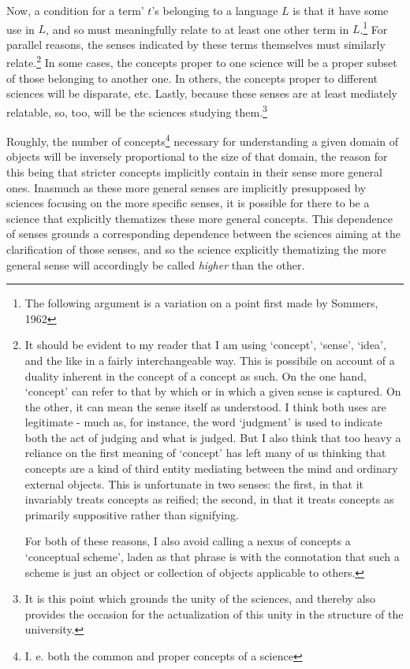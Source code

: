 \documentclass[]{article}
\begin{document}
Now, a condition for a term' $t$'s belonging to a language $L$ is that it have some use in $L$, and so must meaningfully relate to at least one other term in $L$.\footnote{The following argument is a variation on a point first made by Sommers, 1962} For parallel reasons, the senses indicated by these terms themselves must similarly relate.\footnote{It should be evident to my reader that I am using `concept', `sense', `idea', and the like in a fairly interchangeable way. This is possibile on account of a duality inherent in the concept of a concept as such. On the one hand, `concept' can refer to that by which or in which a given sense is captured. On the other, it can mean the sense itself as understood. I think both uses are legitimate - much as, for instance, the word `judgment' is used to indicate both the act of judging and what is judged. But I also think that too heavy a reliance on the first meaning of `concept' has left many of us thinking that concepts are a kind of third entity mediating between the mind and ordinary external objects. This is unfortunate in two senses: the first, in that it invariably treats concepts as reified; the second, in that it treats concepts as primarily suppositive rather than signifying. 

For both of these reasons, I also avoid calling a nexus of concepts a `conceptual scheme', laden as that phrase is with the connotation that such a scheme is just an object or collection of objects applicable to others.} In some cases, the concepts proper to one science will be a proper subset of those belonging to another one. In others, the concepts proper to different sciences will be disparate, etc. Lastly, because these senses are at least mediately relatable, so, too, will be the sciences studying them.\footnote{It is this point which grounds the unity of the sciences, and thereby also provides the occasion for the actualization of this unity in the structure of the university.}

Roughly, the number of concepts\footnote{I. e. both the common and proper concepts of a science} necessary for understanding a given domain of objects will be inversely proportional to the size of that domain, the reason for this being that stricter concepts implicitly contain in their sense more general ones. Inasmuch as these more general senses are implicitly presupposed by sciences focusing on the more specific senses, it is possible for there to be a science that explicitly thematizes these more general concepts. This dependence of senses grounds a corresponding dependence between the sciences aiming at the clarification of those senses, and so the science explicitly thematizing the more general sense will accordingly be called \textit{higher} than the other.
\end{document}
